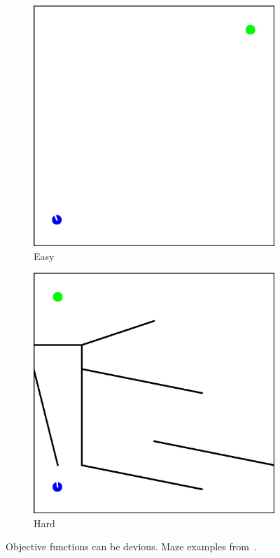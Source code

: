 \begin{figure}[t!]
\centering
\begin{subfigure}[b]{0.3\textwidth}
\includegraphics[width=1.0\textwidth]{../Figures/Misc/MazeEasy.jpg}
\caption{Easy}
\label{fig:mazeEasy}
\end{subfigure}\hspace{2cm} 
\begin{subfigure}[b]{0.3\textwidth} 
\includegraphics[width=1.0\textwidth]{../Figures/Misc/MazeHard.jpg}
\caption{Hard}
\label{fig:mazeHard}
\end{subfigure}
\caption{Objective functions can be devious. Maze examples from~\citep{lehman2011abandoning}.}
\label{fig:maze}
\end{figure}


